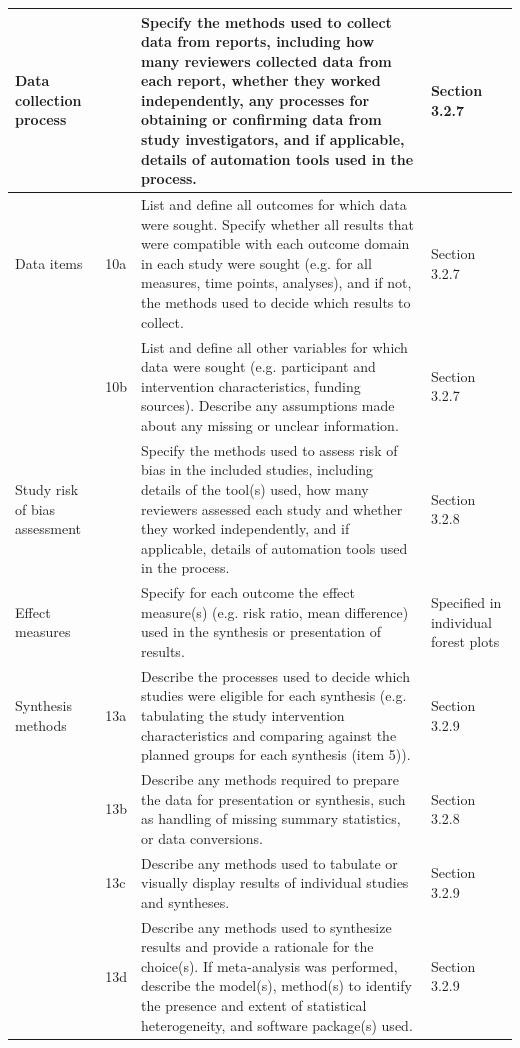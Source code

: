 \documentclass[a4paper, twoside]{templates/ociamthesis}
\begin{document}
\begin{longtable}[t]{>{\raggedright\arraybackslash}p{8.45em}>{\centering\arraybackslash}p{2.1em}>{\raggedright\arraybackslash}p{13.5em}>{\raggedright\arraybackslash}p{7.45em}}
\midrule
\addlinespace
Data collection process & 9 & Specify the methods used to collect data from reports, including how many reviewers collected data from each report, whether they worked independently, any processes for obtaining or confirming data from study investigators, and if applicable, details of automation tools used in the process. & Section 3.2.7\\
\midrule
\addlinespace
Data items & 10a & List and define all outcomes for which data were sought. Specify whether all results that were compatible with each outcome domain in each study were sought (e.g. for all measures, time points, analyses), and if not, the methods used to decide which results to collect. & Section 3.2.7\\
\midrule
\addlinespace
 & 10b & List and define all other variables for which data were sought (e.g. participant and intervention characteristics, funding sources). Describe any assumptions made about any missing or unclear information. & Section 3.2.7\\
\midrule
\addlinespace
Study risk of bias assessment & 11 & Specify the methods used to assess risk of bias in the included studies, including details of the tool(s) used, how many reviewers assessed each study and whether they worked independently, and if applicable, details of automation tools used in the process. & Section 3.2.8\\
\midrule
\addlinespace
Effect measures & 12 & Specify for each outcome the effect measure(s) (e.g. risk ratio, mean difference) used in the synthesis or presentation of results. & Specified in individual forest plots\\
\midrule
\addlinespace
Synthesis methods & 13a & Describe the processes used to decide which studies were eligible for each synthesis (e.g. tabulating the study intervention characteristics and comparing against the planned groups for each synthesis (item 5)). & Section 3.2.9\\
\midrule
\addlinespace
 & 13b & Describe any methods required to prepare the data for presentation or synthesis, such as handling of missing summary statistics, or data conversions. & Section 3.2.8\\
\midrule
\addlinespace
 & 13c & Describe any methods used to tabulate or visually display results of individual studies and syntheses. & Section 3.2.9\\
\midrule
\addlinespace
 & 13d & Describe any methods used to synthesize results and provide a rationale for the choice(s). If meta-analysis was performed, describe the model(s), method(s) to identify the presence and extent of statistical heterogeneity, and software package(s) used. & Section 3.2.9\\

\end{longtable}
\end{document}
